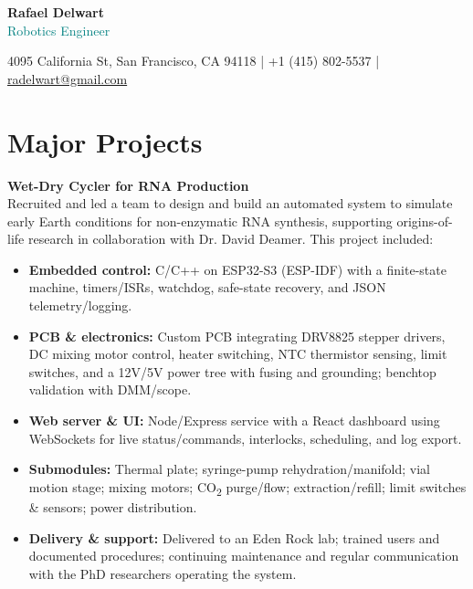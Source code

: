 \documentclass[a4paper,9pt]{article}
\begin{document}
\begin{center}
    {\Large \textbf{Rafael Delwart}} \\
    {\small \textcolor{teal}{Robotics Engineer}} \\
    \vspace{0.2em}
    {\footnotesize
        4095 California St, San Francisco, CA 94118 \quad | \quad
        +1 (415) 802-5537 \quad | \quad
        \href{mailto:radelwart@gmail.com}{radelwart@gmail.com} \quad 
        
    }
    \vspace{0.5em}
\end{center}


\section*{Major Projects}

\small 
\textbf{Wet-Dry Cycler for RNA Production} \\
Recruited and led a team to design and build an automated system to simulate early Earth conditions for non-enzymatic RNA synthesis, supporting origins-of-life research in collaboration with Dr. David Deamer. This project included:
\begin{itemize}[leftmargin=*,itemsep=1pt,topsep=0pt,parsep=0pt,partopsep=0pt]
  \item \textbf{Embedded control:} C/C++ on ESP32-S3 (ESP-IDF) with a finite-state machine, timers/ISRs, watchdog, safe-state recovery, and JSON telemetry/logging.
  \item \textbf{PCB \& electronics:} Custom PCB integrating DRV8825 stepper drivers, DC mixing motor control, heater switching, NTC thermistor sensing, limit switches, and a 12V/5V power tree with fusing and grounding; benchtop validation with DMM/scope.
  \item \textbf{Web server \& UI:} Node/Express service with a React dashboard using WebSockets for live status/commands, interlocks, scheduling, and log export.
  \item \textbf{Submodules:} Thermal plate; syringe-pump rehydration/manifold; vial motion stage; mixing motors; CO\textsubscript{2} purge/flow; extraction/refill; limit switches \& sensors; power distribution.
  \item \textbf{Delivery \& support:} Delivered to an Eden Rock lab; trained users and documented procedures; continuing maintenance and regular communication with the PhD researchers operating the system.
\end{itemize}
\end{document}
